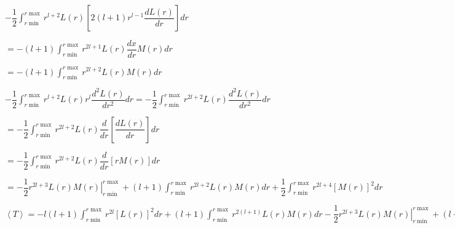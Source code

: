 \documentclass{jarticle}%
\begin{document}
$-\dfrac{1}{2}%
{\displaystyle\int\nolimits_{r\min}^{r\max}}
r^{l+2}L\left(  r\right)  \left[  2\left(  l+1\right)  r^{l-1}\dfrac{dL\left(
r\right)  }{dr}\right]  dr$

$=-\left(  l+1\right)
{\displaystyle\int\nolimits_{r\min}^{r\max}}
r^{2l+1}L\left(  r\right)  \dfrac{dx}{dr}M\left(  r\right)  dr$

$=-\left(  l+1\right)
{\displaystyle\int\nolimits_{r\min}^{r\max}}
r^{2l+2}L\left(  r\right)  M\left(  r\right)  dr$

$-\dfrac{1}{2}%
{\displaystyle\int\nolimits_{r\min}^{r\max}}
r^{l+2}L\left(  r\right)  r^{l}\dfrac{d^{2}L\left(  r\right)  }{dr^{2}%
}dr=-\dfrac{1}{2}%
{\displaystyle\int\nolimits_{r\min}^{r\max}}
r^{2l+2}L\left(  r\right)  \dfrac{d^{2}L\left(  r\right)  }{dr^{2}}dr$

$=-\dfrac{1}{2}%
{\displaystyle\int\nolimits_{r\min}^{r\max}}
r^{2l+2}L\left(  r\right)  \dfrac{d}{dr}\left[  \dfrac{dL\left(  r\right)
}{dr}\right]  dr$

$=-\dfrac{1}{2}%
{\displaystyle\int\nolimits_{r\min}^{r\max}}
r^{2l+2}L\left(  r\right)  \dfrac{d}{dr}\left[  rM\left(  r\right)  \right]
dr$

$=-\dfrac{1}{2}\left.  r^{2l+3}L\left(  r\right)  M\left(  r\right)
\right\vert _{r\min}^{r\max}+\left(  l+1\right)
{\displaystyle\int\nolimits_{r\min}^{r\max}}
r^{2l+2}L\left(  r\right)  M\left(  r\right)  dr+\dfrac{1}{2}%
{\displaystyle\int\nolimits_{r\min}^{r\max}}
r^{2l+4}\left[  M\left(  r\right)  \right]  ^{2}dr$

$\left\langle T\right\rangle =-l\left(  l+1\right)
{\displaystyle\int\nolimits_{r\min}^{r\max}}
r^{2l}\left[  L\left(  r\right)  \right]  ^{2}dr+\left(  l+1\right)
{\displaystyle\int\nolimits_{r\min}^{r\max}}
r^{2\left(  l+1\right)  }L\left(  r\right)  M\left(  r\right)  dr-\dfrac{1}%
{2}\left.  r^{2l+3}L\left(  r\right)  M\left(  r\right)  \right\vert _{r\min
}^{r\max}+\left(  l+1\right)
{\displaystyle\int\nolimits_{r\min}^{r\max}}
r^{2l+2}L\left(  r\right)  M\left(  r\right)  dr+\dfrac{1}{2}%
{\displaystyle\int\nolimits_{r\min}^{r\max}}
r^{2l+4}\left[  M\left(  r\right)  \right]  ^{2}dr$
\end{document}
